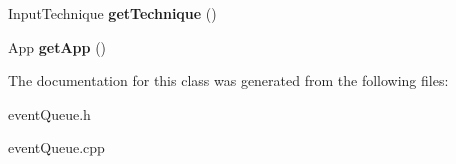 \begin{DoxyCompactItemize}
\item 
\hypertarget{classpho_1_1EventQueue_a8b0dac3ce56de908914461d93716c33d}{Input\-Technique {\bfseries get\-Technique} ()}\label{classpho_1_1EventQueue_a8b0dac3ce56de908914461d93716c33d}

\item 
\hypertarget{classpho_1_1EventQueue_a3b9d803d2ac2f0514da964852bcd5ba8}{App {\bfseries get\-App} ()}\label{classpho_1_1EventQueue_a3b9d803d2ac2f0514da964852bcd5ba8}

\end{DoxyCompactItemize}


The documentation for this class was generated from the following files\-:\begin{DoxyCompactItemize}
\item 
event\-Queue.\-h\item 
event\-Queue.\-cpp\end{DoxyCompactItemize}
